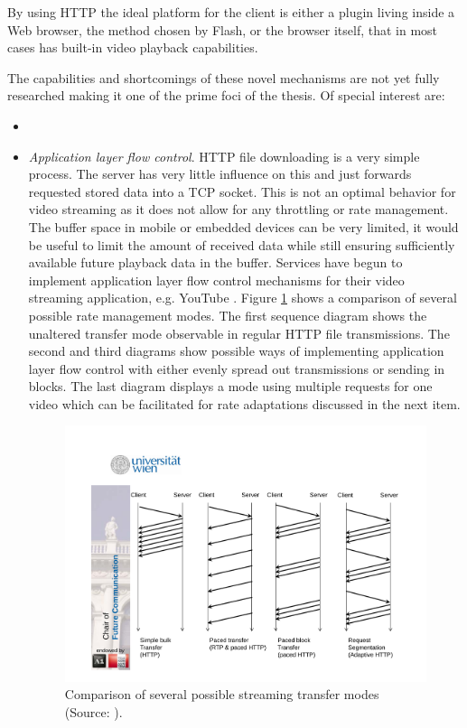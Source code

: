 By using \gls{HTTP} the ideal platform for the client is either a plugin living inside a Web browser, the method chosen by Flash, or the browser itself, that in most cases has built-in video playback capabilities.

The capabilities and shortcomings of these novel mechanisms are not yet fully researched making it one of the prime foci of the thesis. Of special interest are:
 
\begin{itemize}

\item 

\item \textit{Application layer flow control}. \gls{HTTP} file downloading is a very simple process. The server has very little influence on this and just forwards requested stored data into a TCP socket. This is not an optimal behavior for video streaming as it does not allow for any throttling or rate management. The buffer space in mobile or embedded devices can be very limited, it would be useful to limit the amount of received data while still ensuring sufficiently available future playback data in the buffer. Services have begun to implement application layer flow control mechanisms for their video streaming application, e.g. YouTube \cite{alcock2011afcyt}. Figure \ref{c3:fig:streamingtransfermodes} shows a comparison of several possible rate management modes. The first sequence diagram shows the unaltered transfer mode observable in regular HTTP file transmissions. The second and third diagrams show possible ways of implementing application layer flow control with either evenly spread out transmissions or sending in blocks. The last diagram displays a mode using multiple requests for one video which can be facilitated for rate adaptations discussed in the next item.

\begin{figure}[htbp]
\centering
\includegraphics[width=1.0\textwidth]{images/streaming-transfer-modes.pdf}
\caption{Comparison of several possible streaming transfer modes (Source: \cite{ma2011mobile}).}
\label{c3:fig:streamingtransfermodes}
\end{figure}


\end{itemize}
